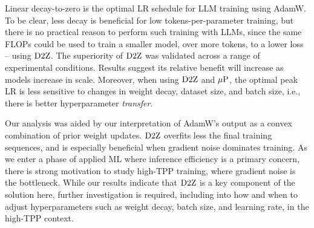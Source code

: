Linear decay-to-zero is the optimal LR schedule for LLM training using
AdamW\@.
%
To be clear, less decay is beneficial for low tokens-per-parameter
training, but there is no practical reason to perform such training
with LLMs, since the same FLOPs could be used to train a smaller
model, over more tokens, to a lower loss -- using $\mbox{D2Z}$.
%
The superiority of $\mbox{D2Z}$ was validated across a range of
experimental conditions.  Results suggest its relative benefit will
increase as models increase in scale.  Moreover, when using $\mbox{D2Z}$
and $\mbox{$\mu$P}$, the optimal peak LR is less sensitive to changes in weight
decay, dataset size, and batch size, i.e., there is better
hyperparameter \emph{transfer}.

%
Our analysis was aided by our interpretation of AdamW's output as a
convex combination of prior weight updates.
%
$\mbox{D2Z}$ overfits less the final training sequences, and is especially
beneficial when gradient noise dominates training.
%
As we enter a phase of applied ML where inference efficiency is a
primary concern, there is strong motivation to study high-TPP
training, where gradient noise is the bottleneck.
%
While our results indicate that $\mbox{D2Z}$ is a key component of the
solution here, further investigation is required, including into how
and when to adjust hyperparameters such as weight decay, batch size,
and learning rate, in the high-TPP context.
